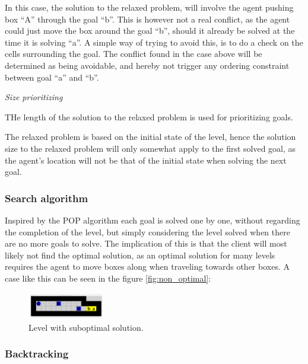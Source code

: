 \documentclass[Main]{subfiles}
\begin{document}
In this case, the solution to the relaxed problem, will involve the agent pushing box ``A'' through the goal ``b''. This is however not a real conflict, as the agent could just move the box around the goal ``b'', should it already be solved at the time it is solving ``a''. A simple way of trying to avoid this, is to do a check on the cells surrounding the goal. 
The conflict found in the case above will be determined as being avoidable, and hereby not trigger any ordering constraint between goal ``a'' and ``b''. 


\textit{Size prioritizing} 

THe length of the solution to the relaxed problem is used for prioritizing goals. 

The relaxed problem is based on the initial state of the level, hence the solution size to the relaxed problem will only somewhat apply to the first solved goal, as the agent's location will not be that of the initial state when solving the next goal. 



\subsubsection{Search algorithm}
Inspired by the POP algorithm each goal is solved one by one, without regarding the completion of the level, but simply considering the level solved when there are no more goals to solve. The implication of this is that the client will most likely not find the optimal solution, as an optimal solution for many levels requires the agent to move boxes along when traveling towards other boxes. A case like this can be seen in the figure \autoref{fig:non_optimal}:
\begin{figure}[h!]
    \centering
    \includegraphics[width=0.3\textwidth]{non_optimal.png}
    \caption{Level with suboptimal solution.}
    \label{fig:non_optimal}
\end{figure}




\subsubsection{Backtracking}
\end{document}

